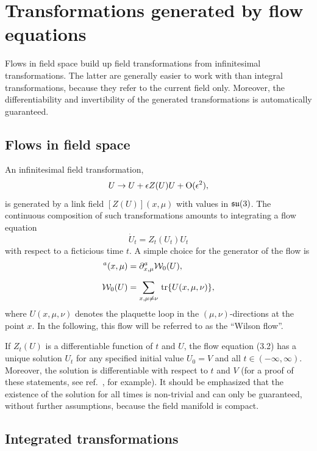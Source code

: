 \section{Transformations generated by flow equations}

Flows in field space build up field transformations
from infinitesimal transformations.
The latter are generally easier to work with than
integral transformations, because they refer to the current
field only. Moreover, the differentiability and invertibility
of the generated transformations is
automatically guaranteed.


\subsection{Flows in field space}

An infinitesimal field transformation,
\begin{equation}
  U\to U+\epsilon Z(U)U+\mathrm{O}(\epsilon^2),
\end{equation}
is generated by a link field $[Z(U)](x,\mu)$ with
values in $\mathfrak{su}(3)$. The continuous composition of
such transformations
amounts to integrating a flow equation
\begin{equation}
  \dot{U}_t=Z_t(U_t)U_t
\end{equation}
with respect to a ficticious time $t$. A simple choice
for the generator of the flow is
\begin{align}
  [Z_t(U)]^a(x,\mu)&=\du^a_{x,\mu}\Wl_0(U),
  \\[1.5ex]
  \Wl_0(U)&=\sum_{x,\mu\neq\nu}\,\tr\{U(x,\mu,\nu)\},
\end{align}
where $U(x,\mu,\nu)$ denotes the plaquette loop in the
$(\mu,\nu)$-directions at the point $x$.
In the following, this flow will be referred to
as the ``Wilson flow''.

If $Z_t(U)$ is a differentiable function of $t$ and $U$, the flow equation
(3.2) has a unique solution $U_t$ for any specified initial value $U_0=V$
and all $t\in(-\infty,\infty)$. Moreover,
the solution is differentiable with respect to
$t$ and $V$ (for a proof of these statements,
see ref.~\cite{ArnoldI}, for example).
It should be
emphasized that the existence of the
solution for all times is non-trivial and can
only be guaranteed, without further
assumptions, because the field manifold is compact.


\subsection{Integrated transformations}

